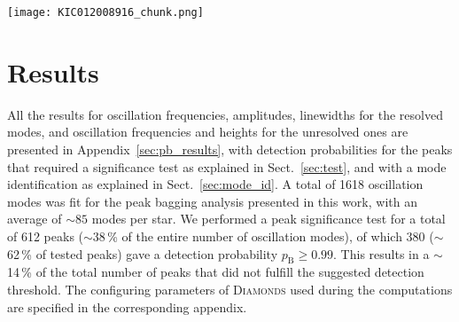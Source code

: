 \documentclass[structabstract]{aa}
\newcommand{\diamonds}{\textsc{D\large{iamonds}}}
\newcommand{\kic}{KIC~12008916}
\begin{document}
\begin{figure*}[t!]
   \centering
   \texttt{[image: KIC012008916\_chunk.png]}
      \caption{Example of a fit chunk for \kic\,\,derived by \diamonds. The PSD is shown in black, whilst the resulting fit using the parameters listed in Tables~\ref{tab:12008916m} and \ref{tab:12008916p} is in indicated by a green solid line. The level of eight times the background is shown with a blue dashed line as a reference for the peak significance. The colored vertical bands underline the oscillation modes modeled by a Lorentzian profile, Eq.~(\ref{eq:resolved_profile}), with $\ell = 0$ in blue, $\ell = 2$ in green, $\ell = 3$ in orange, and $\ell = 1$ mixed modes in red. The vertical dotted lines mark the central frequency $\nu_0$ for each of the fit modes, with the corresponding mode identification (Peak \#, $\ell$, $m$) also labeled, according to the description given in Appendix~\ref{sec:pb_results}. The case of the unresolved mixed mode $(26,1,-1)$ is shown in red because the peak has a detection probability ($p_\mathrm{B} = 0.002$) below the threshold suggested in Sect.~\ref{sec:test}.}
    \label{fig:chunk}
\end{figure*}

\section{Results}
\label{sec:results}
All the results for oscillation frequencies, amplitudes, linewidths for the resolved modes, and oscillation frequencies and heights for the unresolved ones are presented in Appendix~\ref{sec:pb_results}, with detection probabilities for the peaks that required a significance test as explained in Sect.~\ref{sec:test}, and with a mode identification as explained in Sect.~\ref{sec:mode_id}. A total of 1618 oscillation modes was fit for the peak bagging analysis presented in this work, with an average of $\sim85$ modes per star. We performed a peak significance test for a total of 612 peaks ($\sim$38\,\% of the entire number of oscillation modes), of which 380 ($\sim$62\,\% of tested peaks) gave a detection probability $p_\mathrm{B} \geq 0.99$. This results in a $\sim$14\,\% of the total number of peaks that did not fulfill the suggested detection threshold. The configuring parameters of \diamonds\,\,used during the computations are specified in the corresponding appendix. 
\end{document}
